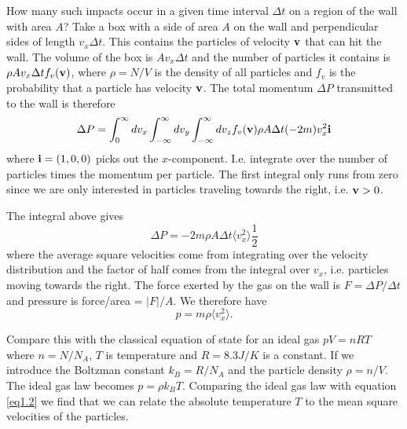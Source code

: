 How many such impacts occur in a given time interval $\Delta t$ on a region of the wall with area $A$? 
Take a box with a side of area $A$ on the wall and perpendicular sides of length $v_x\Delta t$. This contains the particles of velocity ${\bf v}$ that can hit the wall. The volume of the box is $Av_x\Delta t$ and the number of particles it contains is $\rho Av_x\Delta t f_v({\bf v})$, where $\rho=N/V$ is the density of all particles  and $f_v$ is the probability that a particle has velocity $\bf v$.
The total momentum $\Delta P$ transmitted to the wall is therefore
$$\Delta P =\int_0^\infty dv_x \int_{-\infty}^\infty dv_y \int_{-\infty}^\infty dv_z f_v({\bf v})\rho A\Delta t(-2m)v_x^2{\bf i}$$
where ${\bf i} =(1,0,0)$ picks out the $x$-component. I.e. integrate over the number of particles times the momentum per particle. The first integral only runs from zero since we are only interested in particles traveling towards the right, i.e. ${\bf v}>0$.

The integral above gives 
$$\Delta P = -2m\rho A\Delta t \langle v_x^2\rangle\frac12$$ where the average square velocities come from integrating over the velocity distribution and the factor of half comes from the integral over $v_x$, i.e. particles moving towards the right.
The force exerted by the gas on the wall is $F=\Delta P/\Delta t$ and pressure is force/area = $|F|/A$.
We therefore have 
\begin{equation}
	p=m\rho  \langle v_x^2\rangle.
	\label{eq1.2}
\end{equation}
 
Compare this with the classical equation of state for an ideal gas $pV=nRT$ where $n=N/N_A$, $T$ is temperature and $R=8.3 J/K$ is a constant. If we introduce the Boltzman constant $k_B = R/N_A$ and the particle density $\rho =n/V$. The ideal gas law becomes $p=\rho k_BT$. Comparing the ideal gas law with equation \ref{eq1.2} 
we find that we can relate the absolute temperature $T$ to the mean square velocities of the particles.


